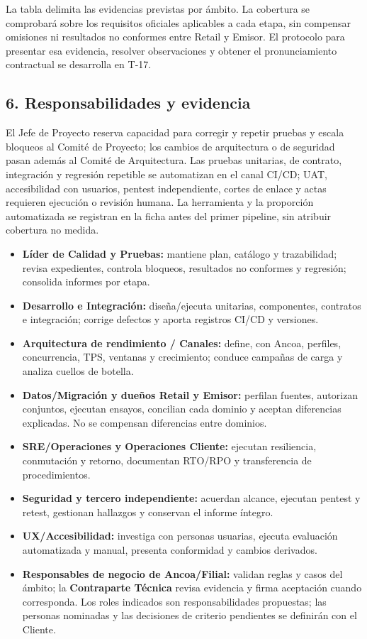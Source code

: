 \documentclass[11pt]{article}
\providecommand{\tightlist}{%
  \setlength{\itemsep}{0pt}\setlength{\parskip}{0pt}}
\begin{document}
La tabla delimita las evidencias previstas por ámbito. La cobertura se comprobará sobre los requisitos oficiales aplicables a cada etapa, sin compensar omisiones ni resultados no conformes entre Retail y Emisor. El protocolo para presentar esa evidencia, resolver observaciones y obtener el pronunciamiento contractual se desarrolla en T-17.

\subsection{6. Responsabilidades y evidencia}\label{t13-responsabilidades-y-evidencia}

El Jefe de Proyecto reserva capacidad para corregir y repetir pruebas y escala bloqueos al Comité de Proyecto; los cambios de arquitectura o de seguridad pasan además al Comité de Arquitectura. Las pruebas unitarias, de contrato, integración y regresión repetible se automatizan en el canal CI/CD; UAT, accesibilidad con usuarios, pentest independiente, cortes de enlace y actas requieren ejecución o revisión humana. La herramienta y la proporción automatizada se registran en la ficha antes del primer pipeline, sin atribuir cobertura no medida.

\begin{itemize}
\tightlist
\item
  \textbf{Líder de Calidad y Pruebas:} mantiene plan, catálogo y trazabilidad; revisa expedientes, controla bloqueos, resultados no conformes y regresión; consolida informes por etapa.
\item
  \textbf{Desarrollo e Integración:} diseña/ejecuta unitarias, componentes, contratos e integración; corrige defectos y aporta registros CI/CD y versiones.
\item
  \textbf{Arquitectura de rendimiento / Canales:} define, con Ancoa, perfiles, concurrencia, TPS, ventanas y crecimiento; conduce campañas de carga y analiza cuellos de botella.
\item
  \textbf{Datos/Migración y dueños Retail y Emisor:} perfilan fuentes, autorizan conjuntos, ejecutan ensayos, concilian cada dominio y aceptan diferencias explicadas. No se compensan diferencias entre dominios.
\item
  \textbf{SRE/Operaciones y Operaciones Cliente:} ejecutan resiliencia, conmutación y retorno, documentan RTO/RPO y transferencia de procedimientos.
\item
  \textbf{Seguridad y tercero independiente:} acuerdan alcance, ejecutan pentest y retest, gestionan hallazgos y conservan el informe íntegro.
\item
  \textbf{UX/Accesibilidad:} investiga con personas usuarias, ejecuta evaluación automatizada y manual, presenta conformidad y cambios derivados.
\item
  \textbf{Responsables de negocio de Ancoa/Filial:} validan reglas y casos del ámbito; la \textbf{Contraparte Técnica} revisa evidencia y firma aceptación cuando corresponda. Los roles indicados son responsabilidades propuestas; las personas nominadas y las decisiones de criterio pendientes se definirán con el Cliente.
\end{itemize}
\end{document}
